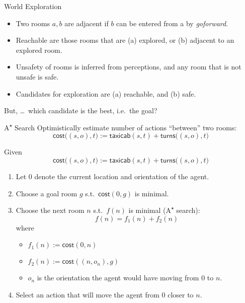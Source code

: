 \documentclass[smaller,dvipsnames,ratio=169,10pt]{beamer}
\begin{document}
  \begin{frame}{World Exploration}  
	 \begin{itemize}
	 	\item Two rooms $a, b$ are \alert{adjacent} if $b$ can be entered from a by \emph{goforward}.
	 	\item \alert{Reachable} are those rooms that are (a) explored, \alert{or} (b) adjacent to an explored room.
	 	\item Unsafety of rooms is inferred from perceptions, and any room that is not unsafe is \alert{safe}.
	 	\item Candidates for exploration are (a) reachable, \alert{and} (b) safe.
	 \end{itemize}
	 
	 But, \ldots\ which candidate is the best, i.e.\ the \alert{goal}?
  \end{frame}
  
  \begin{frame}[allowframebreaks]{A\textsuperscript{$\star$} Search}
	\small{Optimistically estimate number of actions \enquote{between} two rooms:}
	$$\mathsf{cost}\big((s, o), t\big) := \mathsf{taxicab}(s,t) + \mathsf{turns}\big((s, o), t\big)$$ 	    %
    \begin{center}\vspace{-5mm}\resizebox{0.7\textheight}{0.7\textheight}{}\vspace{-10mm}\end{center}
	\framebreak
	Given $$\mathsf{cost}\big((s, o), t\big) := \mathsf{taxicab}(s,t) + \mathsf{turns}\big((s, o), t\big)$$\vspace{-5mm}\begin{enumerate}
	    \item Let 0 denote the current location and orientation of the agent.
		\item Choose a \alert{goal} room $g$ s.t.\ $\mathsf{cost}(0, g)$ is minimal.
	    \item Choose the \alert{next} room $n$ s.t.\ $f(n)$ is minimal (A\textsuperscript{$\star$} search): 
	    $$f(n) = f_1(n) + f_2(n)$$ \vspace{-2mm} where
	    \begin{itemize}
	    	\item $f_1(n) := \mathsf{cost}(0, n)$
	    	\item $f_2(n) := \mathsf{cost}((n, o_n), g)$
	    	\item $o_n$ is the orientation the agent would have moving from 0 to $n$.
	    \end{itemize}
	    \item Select an action that will move the agent from 0 closer to $n$.
	\end{enumerate}
  \end{frame}
\end{document}
